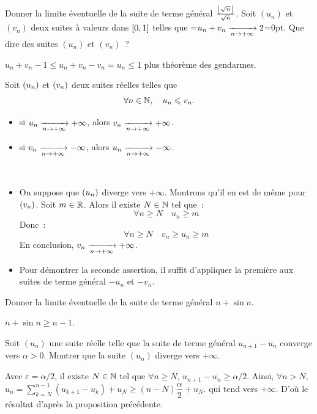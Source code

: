 \documentclass{magnolia}
\begin{document}
\begin{exos}
\exo Donner la limite éventuelle de la suite de terme général
  $\frac{\left\lfloor\sqrt{n}\right\rfloor}{\sqrt{n}}$.
\exo Soit $(u_n)$ et $(v_n)$ deux suites à valeurs dans $\left[0,1\right]$
  telles que =\hbox{$u_n+v_n\xrightarrow[n\rightarrow +\infty]{} 2$}=0pt.
  Que dire des suites $(u_n)$ et $(v_n)$~?
  \begin{sol}
  $u_n+v_n-1\leq u_n+v_n-v_n=u_n\leq 1$ plus théorème des gendarmes.
  \end{sol}
\end{exos}

\begin{proposition}[utile=-3]
Soit $\left(u_n\right)$ et $\left(v_n\right)$ deux suites réelles telles que
\[\forall n\in\mathbb{N} ,\quad u_n \leqslant v_n.\]
\begin{itemize}
\item si $u_n\xrightarrow[n\rightarrow +\infty]{}+\infty$, alors
  $v_n\xrightarrow[n\rightarrow +\infty]{}+\infty$.
\item si $v_n\xrightarrow[n\rightarrow +\infty]{}-\infty$, alors
  $u_n\xrightarrow[n\rightarrow +\infty]{}-\infty$.
\end{itemize}
\end{proposition}

\begin{preuve}
$\quad$
\begin{itemize}
\item On suppose que $\left(u_n\right)$ diverge vers $+\infty$. Montrons qu'il en est
  de même pour $\left(v_n\right)$. Soit $m\in\mathbb{R}$. Alors il existe $N\in\mathbb{N}$ tel que~:
  \[\forall n\geq N \quad u_n \geq m\]
  Donc~:
  \[\forall n\geq N \quad v_n \geq u_n \geq m\]
  En conclusion, $v_n\xrightarrow[n\rightarrow +\infty]{}+\infty$.
\item Pour démontrer la seconde assertion, il suffit d'appliquer la première
  aux suites de terme général $-u_n$ et $-v_n$.
\end{itemize}
\end{preuve}

\begin{exos}
\exo Donner la limite éventuelle de la suite de terme général
  $n+\sin n$.
  \begin{sol}
  $n+\sin n\geq n-1$.
  \end{sol}
\exo Soit $(u_n)$ une suite réelle telle que la suite de terme général
  $u_{n+1}-u_n$ converge vers $\alpha>0$. Montrer que la suite $(u_n)$ diverge
  vers $+\infty$.
  \begin{sol}
  Avec $\varepsilon=\alpha/2$, il existe $N\in \mathbb{N}$ tel que $\forall n\geq N$, $u_{n+1}-u_n\geq \alpha/2$. Ainsi, $\forall n> N$, $u_n=\displaystyle \sum_{k=N}^{n-1}(u_{k+1}-u_k)+u_N\geq (n-N)\dfrac{\alpha}{2}+u_N.$ qui tend vers $+\infty$. D'où le résultat d'après la proposition précédente.
  \end{sol}
\end{exos}
\end{document}
